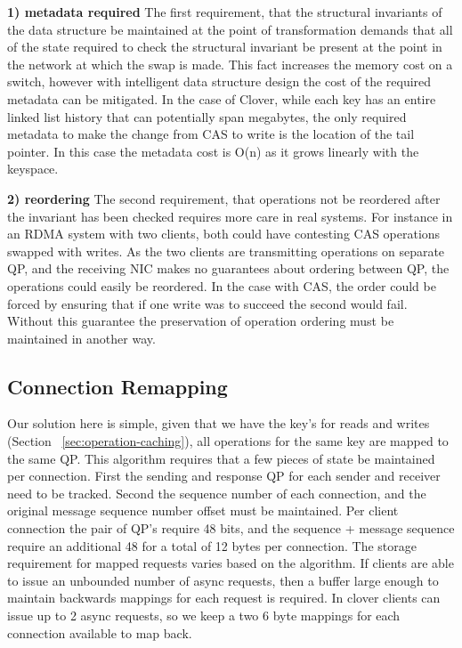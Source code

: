 \textbf{1) metadata required} The first requirement, that the structural invariants
of the data structure be maintained at the point of transformation demands that
all of the state required to check the structural invariant be present at the
point in the network at which the swap is made. This fact increases the memory
cost on a switch, however with intelligent data structure design the cost of the
required metadata can be mitigated. In the case of Clover, while each key has
an entire linked list history that can potentially span megabytes, the only
required metadata to make the change from CAS to write is the location of the
tail pointer. In this case the metadata cost is O(n) as it grows linearly with
the keyspace.

\textbf{2) reordering} The second requirement, that operations not be reordered
after the invariant has been checked requires more care in real systems. For
instance in an RDMA system with two clients, both could have contesting CAS
operations swapped with writes. As the two clients are transmitting operations on
separate QP, and the receiving NIC makes no guarantees about ordering between QP,
the operations could easily be reordered. In the case with CAS, the order could
be forced by ensuring that if one write was to succeed the second would fail.
Without this guarantee the preservation of operation ordering must be maintained
in another way.

\subsection{Connection Remapping}


Our solution here is simple, given that we have the key's for reads and writes
(Section ~\ref{sec:operation-caching}), all operations for the same key are
mapped to the same QP.  This algorithm requires that a few pieces of state be
maintained per connection.  First the sending and response QP for each sender
and receiver need to be tracked. Second the sequence number of each connection,
and the original message sequence number offset must be maintained. Per client
connection the pair of QP's require 48 bits, and the sequence + message sequence
require an additional 48 for a total of 12 bytes per connection. The storage
requirement for mapped requests varies based on the algorithm. If clients are
able to issue an unbounded number of async requests, then a buffer large enough
to maintain backwards mappings for each request is required. In clover clients
can issue up to 2 async requests, so we keep a two 6 byte mappings for each
connection available to map back. 


